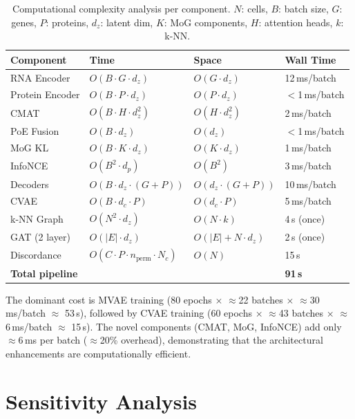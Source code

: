\documentclass[11pt,a4paper]{article}
\begin{document}
\begin{table}[!ht]
\centering
\caption{Computational complexity analysis per component. $N$: cells, $B$: batch size, $G$: genes, $P$: proteins, $d_z$: latent dim, $K$: MoG components, $H$: attention heads, $k$: k-NN.}
\label{tab:complexity}
\scriptsize
\begin{tabular}{l l l l}
\toprule
\textbf{Component} & \textbf{Time} & \textbf{Space} & \textbf{Wall Time} \\
\midrule
RNA Encoder & $O(B \cdot G \cdot d_z)$ & $O(G \cdot d_z)$ & 12\,ms/batch \\
Protein Encoder & $O(B \cdot P \cdot d_z)$ & $O(P \cdot d_z)$ & $<$1\,ms/batch \\
CMAT & $O(B \cdot H \cdot d_z^2)$ & $O(H \cdot d_z^2)$ & 2\,ms/batch \\
PoE Fusion & $O(B \cdot d_z)$ & $O(d_z)$ & $<$1\,ms/batch \\
MoG KL & $O(B \cdot K \cdot d_z)$ & $O(K \cdot d_z)$ & 1\,ms/batch \\
InfoNCE & $O(B^2 \cdot d_p)$ & $O(B^2)$ & 3\,ms/batch \\
Decoders & $O(B \cdot d_z \cdot (G{+}P))$ & $O(d_z \cdot (G{+}P))$ & 10\,ms/batch \\
CVAE & $O(B \cdot d_c \cdot P)$ & $O(d_c \cdot P)$ & 5\,ms/batch \\
k-NN Graph & $O(N^2 \cdot d_z)$ & $O(N \cdot k)$ & 4\,s (once) \\
GAT (2 layer) & $O(|E| \cdot d_z)$ & $O(|E| + N \cdot d_z)$ & 2\,s (once) \\
Discordance & $O(C \cdot P \cdot n_{\text{perm}} \cdot N_c)$ & $O(N)$ & 15\,s \\
\midrule
\textbf{Total pipeline} & & & \textbf{91\,s} \\
\bottomrule
\end{tabular}
\end{table}

The dominant cost is MVAE training (80 epochs $\times$ $\approx$22 batches $\times$ $\approx$30\,ms/batch $\approx$ 53\,s), followed by CVAE training (60 epochs $\times$ $\approx$43 batches $\times$ $\approx$6\,ms/batch $\approx$ 15\,s).
The novel components (CMAT, MoG, InfoNCE) add only $\approx$6\,ms per batch ($\approx$20\% overhead), demonstrating that the architectural enhancements are computationally efficient.

\section{Sensitivity Analysis}\label{sec:sensitivity}
\end{document}
